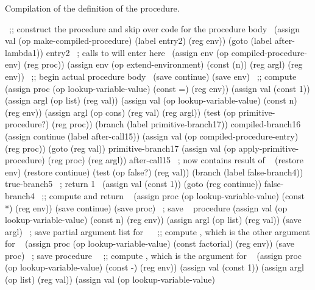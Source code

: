 \begin{exerciseGroup}
\begin{codeFigure}
  {Compilation of the definition of the  procedure.}
\begin{compactCodeBlock}
~\textrm{;; construct the procedure and skip over code for the procedure body}~
  (assign val
          (op make-compiled-procedure)
          (label entry2)
          (reg env))
  (goto (label after-lambda1))
entry2     ~\textrm{; calls to  will enter here}~
  (assign env (op compiled-procedure-env) (reg proc))
  (assign env
          (op extend-environment)
          (const (n))
          (reg argl)
          (reg env))
~\textrm{;; begin actual procedure body}~
  (save continue)
  (save env)
~\textrm{;; compute }~
  (assign proc
          (op lookup-variable-value)
          (const =)
          (reg env))
  (assign val (const 1))
  (assign argl (op list) (reg val))
  (assign val
          (op lookup-variable-value)
          (const n)
          (reg env))
  (assign argl (op cons) (reg val) (reg argl))
  (test (op primitive-procedure?) (reg proc))
  (branch (label primitive-branch17))
compiled-branch16
  (assign continue (label after-call15))
  (assign val (op compiled-procedure-entry) (reg proc))
  (goto (reg val))
primitive-branch17
  (assign val
          (op apply-primitive-procedure)
          (reg proc)
          (reg argl))
after-call15   ~\textrm{;  now contains result of }~
  (restore env)
  (restore continue)
  (test (op false?) (reg val))
  (branch (label false-branch4))
true-branch5  ~\textrm{; return 1}~
  (assign val (const 1))
  (goto (reg continue))
false-branch4
~\textrm{;; compute and return }~
  (assign proc
          (op lookup-variable-value)
          (const *)
          (reg env))
  (save continue)
  (save proc)   ~\textrm{; save \code{*}}~ procedure
  (assign val
          (op lookup-variable-value)
          (const n)
          (reg env))
  (assign argl (op list) (reg val))
  (save argl)   ~\textrm{; save partial argument list for \code{*}}~
~\textrm{;; compute , which is the other argument for \code{*}}~
  (assign proc
          (op lookup-variable-value)
          (const factorial)
          (reg env))
  (save proc)  ~\textrm{; save  procedure}~
~\textrm{;; compute , which is the argument for }~
  (assign proc
          (op lookup-variable-value)
          (const -)
          (reg env))
  (assign val (const 1))
  (assign argl (op list) (reg val))
  (assign val
          (op lookup-variable-value)

\end{compactCodeBlock}
\end{codeFigure}
\end{exerciseGroup}
